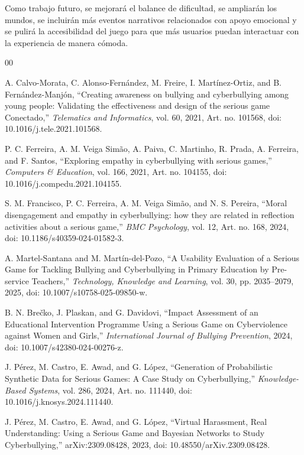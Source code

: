 \documentclass[conference]{IEEEtran}
\begin{document}
Como trabajo futuro, se mejorará el balance de dificultad, se ampliarán los mundos, se incluirán más eventos narrativos relacionados con apoyo emocional y se pulirá la accesibilidad del juego para que más usuarios puedan interactuar con la experiencia de manera cómoda.

\FloatBarrier

\begingroup
\sloppy
\begin{thebibliography}{00}

A. Calvo-Morata, C. Alonso-Fernández, M. Freire, I. Martínez-Ortiz, and B. Fernández-Manjón, ``Creating awareness on bullying and cyberbullying among young people: Validating the effectiveness and design of the serious game Conectado,'' \textit{Telematics and Informatics}, vol. 60, 2021, Art. no. 101568, doi: 10.1016/j.tele.2021.101568.

P. C. Ferreira, A. M. Veiga Simão, A. Paiva, C. Martinho, R. Prada, A. Ferreira, and F. Santos, ``Exploring empathy in cyberbullying with serious games,'' \textit{Computers \& Education}, vol. 166, 2021, Art. no. 104155, doi: 10.1016/j.compedu.2021.104155.

S. M. Francisco, P. C. Ferreira, A. M. Veiga Simão, and N. S. Pereira, ``Moral disengagement and empathy in cyberbullying: how they are related in reflection activities about a serious game,'' \textit{BMC Psychology}, vol. 12, Art. no. 168, 2024, doi: 10.1186/s40359-024-01582-3.

A. Martel-Santana and M. Martín-del-Pozo, ``A Usability Evaluation of a Serious Game for Tackling Bullying and Cyberbullying in Primary Education by Pre-service Teachers,'' \textit{Technology, Knowledge and Learning}, vol. 30, pp. 2035--2079, 2025, doi: 10.1007/s10758-025-09850-w.

B. N. Brečko, J. Plaskan, and G. Davidovi, ``Impact Assessment of an Educational Intervention Programme Using a Serious Game on Cyberviolence against Women and Girls,'' \textit{International Journal of Bullying Prevention}, 2024, doi: 10.1007/s42380-024-00276-z.

J. Pérez, M. Castro, E. Awad, and G. López, ``Generation of Probabilistic Synthetic Data for Serious Games: A Case Study on Cyberbullying,'' \textit{Knowledge-Based Systems}, vol. 286, 2024, Art. no. 111440, doi: 10.1016/j.knosys.2024.111440.

J. Pérez, M. Castro, E. Awad, and G. López, ``Virtual Harassment, Real Understanding: Using a Serious Game and Bayesian Networks to Study Cyberbullying,'' arXiv:2309.08428, 2023, doi: 10.48550/arXiv.2309.08428.


\end{thebibliography}
\end{document}
